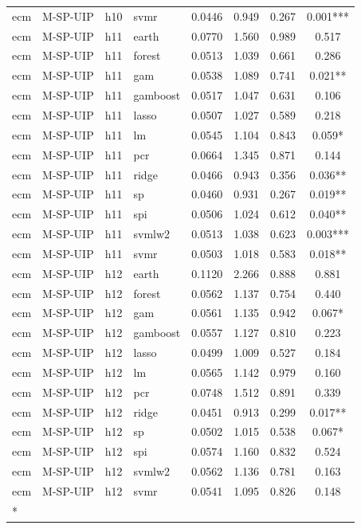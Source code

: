 \begin{ThreePartTable}
\begin{longtable}[t]{llclcccc}
ecm & M-SP-UIP & h10 & svmr & 0.0446 & 0.949 & 0.267 & 0.001***\\
\addlinespace
ecm & M-SP-UIP & h11 & earth & 0.0770 & 1.560 & 0.989 & 0.517\\
ecm & M-SP-UIP & h11 & forest & 0.0513 & 1.039 & 0.661 & 0.286\\
ecm & M-SP-UIP & h11 & gam & 0.0538 & 1.089 & 0.741 & 0.021**\\
ecm & M-SP-UIP & h11 & gamboost & 0.0517 & 1.047 & 0.631 & 0.106\\
ecm & M-SP-UIP & h11 & lasso & 0.0507 & 1.027 & 0.589 & 0.218\\
ecm & M-SP-UIP & h11 & lm & 0.0545 & 1.104 & 0.843 & 0.059*\\
ecm & M-SP-UIP & h11 & pcr & 0.0664 & 1.345 & 0.871 & 0.144\\
ecm & M-SP-UIP & h11 & ridge & 0.0466 & 0.943 & 0.356 & 0.036**\\
ecm & M-SP-UIP & h11 & sp & 0.0460 & 0.931 & 0.267 & 0.019**\\
ecm & M-SP-UIP & h11 & spi & 0.0506 & 1.024 & 0.612 & 0.040**\\
ecm & M-SP-UIP & h11 & svmlw2 & 0.0513 & 1.038 & 0.623 & 0.003***\\
ecm & M-SP-UIP & h11 & svmr & 0.0503 & 1.018 & 0.583 & 0.018**\\
\addlinespace
ecm & M-SP-UIP & h12 & earth & 0.1120 & 2.266 & 0.888 & 0.881\\
ecm & M-SP-UIP & h12 & forest & 0.0562 & 1.137 & 0.754 & 0.440\\
ecm & M-SP-UIP & h12 & gam & 0.0561 & 1.135 & 0.942 & 0.067*\\
ecm & M-SP-UIP & h12 & gamboost & 0.0557 & 1.127 & 0.810 & 0.223\\
ecm & M-SP-UIP & h12 & lasso & 0.0499 & 1.009 & 0.527 & 0.184\\
ecm & M-SP-UIP & h12 & lm & 0.0565 & 1.142 & 0.979 & 0.160\\
ecm & M-SP-UIP & h12 & pcr & 0.0748 & 1.512 & 0.891 & 0.339\\
ecm & M-SP-UIP & h12 & ridge & 0.0451 & 0.913 & 0.299 & 0.017**\\
ecm & M-SP-UIP & h12 & sp & 0.0502 & 1.015 & 0.538 & 0.067*\\
ecm & M-SP-UIP & h12 & spi & 0.0574 & 1.160 & 0.832 & 0.524\\
ecm & M-SP-UIP & h12 & svmlw2 & 0.0562 & 1.136 & 0.781 & 0.163\\
ecm & M-SP-UIP & h12 & svmr & 0.0541 & 1.095 & 0.826 & 0.148\\*
\end{longtable}
\end{ThreePartTable}
\endgroup{}
